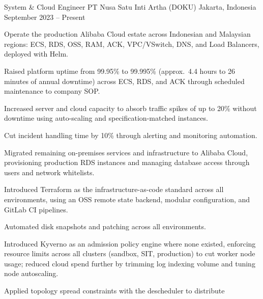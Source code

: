 

\begin{cventries}

  \cventry
    {System \& Cloud Engineer}
    {PT Nusa Satu Inti Artha (DOKU)}
    {Jakarta, Indonesia}
    {September 2023 -- Present}
    {
      \begin{cvitems}
        \item {Operate the production Alibaba Cloud estate across Indonesian and
          Malaysian regions: ECS, RDS, OSS, RAM, ACK, VPC/VSwitch, DNS, and Load
          Balancers, deployed with Helm.}
        \item {Raised platform uptime from 99.95\% to 99.995\% (approx.\ 4.4 hours
          to 26 minutes of annual downtime) across ECS, RDS, and ACK through
          scheduled maintenance to company SOP.}
        \item {Increased server and cloud capacity to absorb traffic spikes of up to
          20\% without downtime using auto-scaling and specification-matched instances.}
        \item {Cut incident handling time by 10\% through alerting and monitoring
          automation.}
        \item {Migrated remaining on-premises services and infrastructure to
          Alibaba Cloud, provisioning production RDS instances and managing
          database access through users and network whitelists.}
        \item {Introduced Terraform as the infrastructure-as-code standard across all
          environments, using an OSS remote state backend, modular configuration,
          and GitLab CI pipelines.}
        \item {Automated disk snapshots and patching across all environments.}
        \item {Introduced Kyverno as an admission policy engine where none existed,
          enforcing resource limits across all clusters (sandbox, SIT, production)
          to cut worker node usage; reduced cloud spend further by trimming log
          indexing volume and tuning node autoscaling.}
        \item {Applied topology spread constraints with the descheduler to distribute
}
\end{cvitems}}
\end{cventries}
